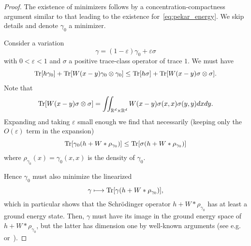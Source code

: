 \documentclass[AHL,Unicode,longabstracts,published]{cedram}
\DeclareMathOperator{\Tr}{Tr}
\newcommand{\R}{\mathbb{R}}
\newcommand{\1}{\mathds{1}}
\newcommand{\eps}{\varepsilon}
\let\oldmapsto\mapsto
\renewcommand*{\mapsto}{\mathchoice{\longmapsto}{\oldmapsto}{\oldmapsto}{\oldmapsto}}
\let\originalleft\left
\let\originalright\right
\renewcommand{\left}{\mathopen{}\mathclose\bgroup\originalleft}
\renewcommand{\right}{\aftergroup\egroup\originalright}
\begin{document}
\begin{proof}
The existence of minimizers follows by a concentration-compactness argument similar to that leading to the existence for~\eqref{eq:pekar_energy}. We skip details and denote $\gamma_0$ a minimizer.

Consider a variation
\begin{equation*}
\gamma = (1- \eps)\gamma_0 + \eps \sigma
\end{equation*}
with $0<\eps <1$ and $\sigma$ a positive trace-class operator of trace $1$. We must have
\[
\Tr\left[h \gamma_0 \right] + \Tr \left[W(x-y) \gamma_0 \otimes \gamma_0 \right] \leq \Tr\left[h \sigma \right] + \Tr \left[W(x-y) \sigma \otimes \sigma \right].
\]
Note that
\[
\Tr \left[W(x-y) \sigma \otimes \sigma \right] = \iint_{\R^d \times \R^d} W(x-y) \sigma (x,x) \sigma (y,y)dxdy.
\]
Expanding and taking $\eps$ small enough we find that necessarily (keeping only the~$O(\eps)$ term in the expansion)
\begin{equation*}
\Tr\left[\gamma_0 \left(h + W\ast \rho_{\gamma_0}\right) \right] \leq \Tr\left[\sigma \left(h + W\ast \rho_{\gamma_0}\right) \right]
\end{equation*}
where $\rho_{\gamma_0} (x) = \gamma_0 (x,x)$ is the density of $\gamma_0$.

Hence $\gamma_0$ must also minimize the linearized
\begin{equation*}
\gamma \mapsto \Tr\left[\gamma \left(h + W\ast \rho_{\gamma_0}\right) \right],
\end{equation*}
which in particular shows that the Schr\"odinger operator $h + W\ast \rho_{\gamma_0}$ has at least a ground energy state. Then, $\gamma$ must have its image in the ground energy space of $h + W\ast \rho_{\gamma_0}$, but the latter has dimension one by well-known arguments (see e.g.~\cite[Theorem~2.3]{Rougerie-EMS} or~\cite[Section~XIII.12]{ReeSim4}).
\end{proof}
\end{document}
